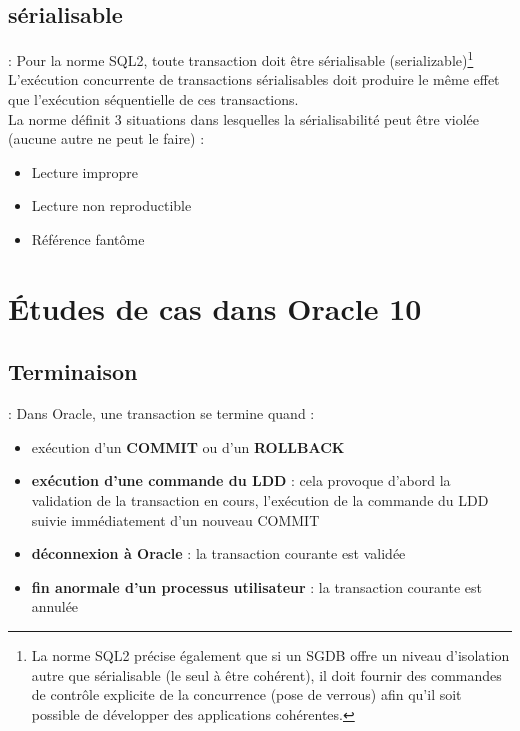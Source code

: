\documentclass[10pt]{beamer}
\begin{document}
\subsection{sérialisable}
\begin{frame}{\secname : \subsecname}
    Pour la norme SQL2, toute transaction doit être  sérialisable (serializable)\footnote{La norme SQL2 précise également que si un SGDB offre un niveau d'isolation autre que sérialisable (le seul à être cohérent), il doit fournir des commandes de contrôle explicite de la concurrence (pose de verrous) afin qu'il soit possible de développer des applications cohérentes.}\\
    L'exécution concurrente de transactions sérialisables doit produire le même effet que l'exécution séquentielle de ces transactions.\\
    La norme définit 3 situations dans lesquelles la sérialisabilité peut être violée (aucune autre ne peut le faire) :
    \begin{itemize}
        \item Lecture impropre
        \item Lecture non reproductible
        \item Référence fantôme
    \end{itemize}
\end{frame}

\section{Études de cas dans Oracle 10}
\tocss
\subsection{Terminaison}
\begin{frame}{\secname : \subsecname}
    Dans Oracle, une transaction se termine quand :
    \begin{itemize}
        \item exécution d'un \textbf{COMMIT} ou d'un \textbf{ROLLBACK}
        \item \textbf{exécution d'une commande du LDD} : cela provoque d'abord la validation de la transaction en cours, l'exécution de la commande du LDD suivie immédiatement d'un nouveau COMMIT
        \item \textbf{déconnexion à Oracle} : la transaction courante est validée
        \item \textbf{fin anormale d'un processus utilisateur} : la transaction courante est annulée
    \end{itemize}
\end{frame}
\end{document}
